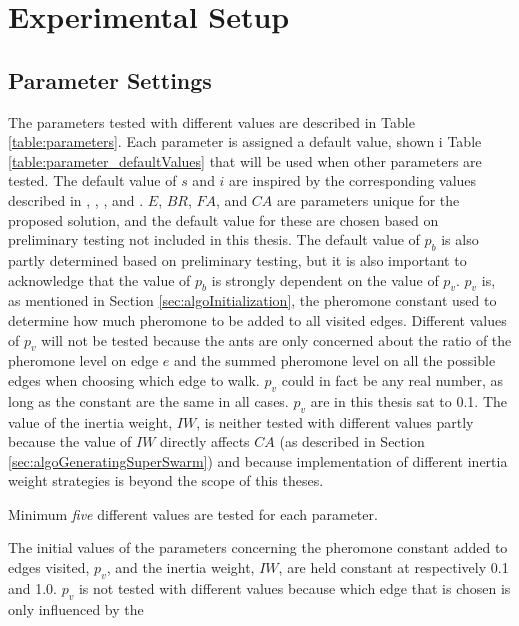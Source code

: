 \section{Experimental Setup}

 
\subsection{Parameter Settings}
\label{subsec:parameterSettings_setup}
The parameters tested with different values are described in Table \ref{table:parameters}. Each parameter is assigned a default value, shown i Table \ref{table:parameter_defaultValues} that will be used when other parameters are tested. The default value of $s$ and $i$ are inspired by the corresponding values described in \citet{salehi-nezhad07}, \citet{poorzahedy11}, \citet{sedighpour14}, and \citet{kechagiopoulos14}. $E$, $BR$, $FA$, and $CA$ are parameters unique for the proposed solution, and the default value for these are chosen based on preliminary testing not included in this thesis. The default value of $p_b$ is also partly determined based on preliminary testing, but it is also important to acknowledge that the value of $p_b$ is strongly dependent on the value of $p_v$. $p_v$ is, as mentioned in Section \vref{sec:algoInitialization}, the pheromone constant used to determine how much pheromone to be added to all visited edges. Different values of $p_v$ will not be tested because the ants are only concerned about the ratio of the pheromone level on edge $e$ and the summed pheromone level on all the possible edges when choosing which edge to walk. $p_v$ could in fact be any real number, as long as the constant are the same in all cases. $p_v$ are in this thesis sat to 0.1. The value of the inertia weight, $IW$, is neither tested with different values partly because the value of $IW$ directly affects $CA$ (as described in Section \vref{sec:algoGeneratingSuperSwarm}) and because implementation of different inertia weight strategies is beyond the scope of this theses. 

Minimum \textit{five} different values are tested for each parameter.



The initial values of the parameters concerning the pheromone constant added to edges visited, $p_v$, and the inertia weight, $IW$, are held constant at respectively 0.1 and 1.0. $p_v$ is not tested with different values because which edge that is chosen is only influenced by the 



